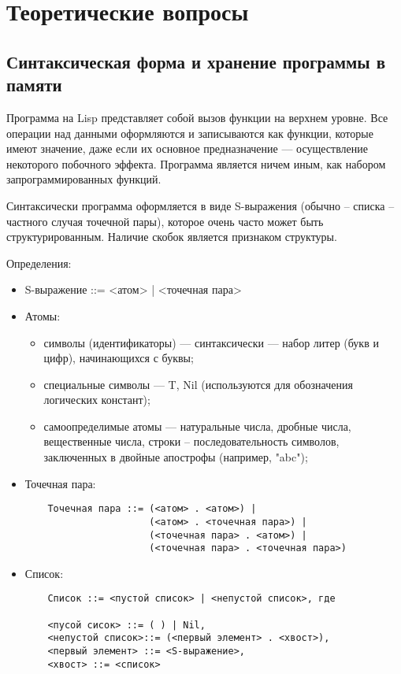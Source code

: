 \chapter{Теоретические вопросы}

\section{Синтаксическая форма и хранение программы в памяти}

Программа на Lisp представляет собой вызов функции на верхнем уровне. Все операции над данными оформляются и  записываются как функции, которые имеют значение, даже если их основное предназначение --- осуществление некоторого побочного эффекта. Программа является ничем иным, как набором запрограммированных функций.

Синтаксически программа оформляется в виде S-выражения (обычно -- списка -- частного случая точечной пары), которое очень часто может быть структурированным. Наличие скобок является признаком структуры. 

Определения:
\begin{itemize}
	\item S-выражение ::= <атом> | <точечная пара>

	\item Атомы:
\begin{itemize} 
	\item символы (идентификаторы) --- синтаксически --- набор литер (букв и цифр), начинающихся с буквы;
	\item специальные символы --- {T, Nil} (используются для обозначения логических констант);
	\item самоопределимые атомы --- натуральные числа, дробные числа, вещественные числа, строки – последовательность символов, заключенных в двойные апострофы (например, "abc");
\end{itemize} 


\item Точечная пара:
\begin{lstlisting}
    Точечная пара ::= (<атом> . <атом>) | 
                      (<атом> . <точечная пара>) | 
                      (<точечная пара> . <атом>) | 
                      (<точечная пара> . <точечная пара>) 
\end{lstlisting}

\item Список:
\begin{lstlisting}
    Список ::= <пустой список> | <непустой список>, где
                
    <пусой сисок> ::= ( ) | Nil,
    <непустой список>::= (<первый элемент> . <хвост>),
    <первый элемент> ::= <S-выражение>,
    <хвост> ::= <список>
\end{lstlisting}


\end{itemize}


